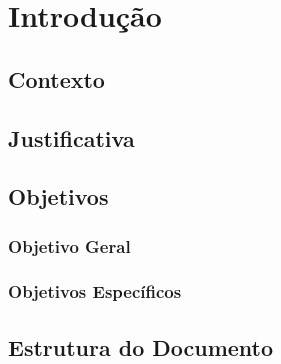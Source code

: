 \chapter[Introdução]{Introdução}

\section{Contexto}

\section{Justificativa}

\section{Objetivos}

\subsection{Objetivo Geral}
\subsection{Objetivos Específicos}

\section{Estrutura do Documento}
